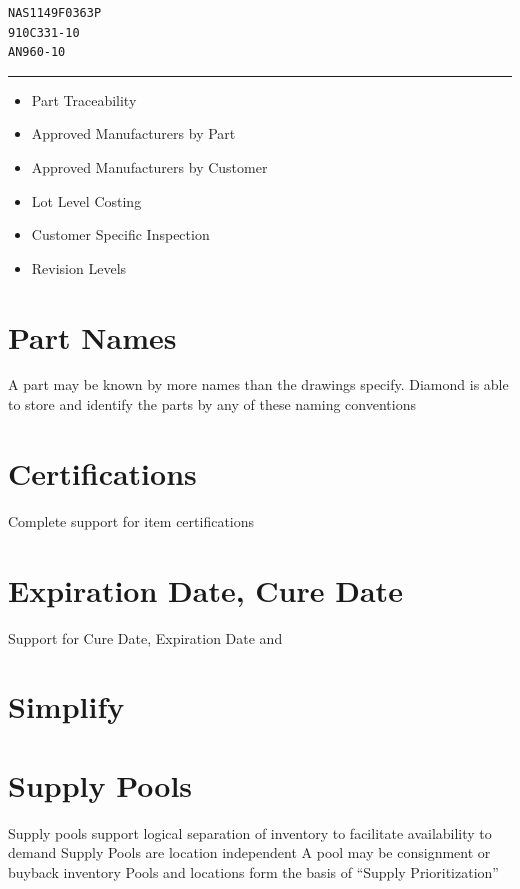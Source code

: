 \documentclass[letterpaper,10pt,english]{sphinxmanual}
\begin{document}
\begin{Verbatim}[commandchars=\\\{\}]
NAS1149F0363P
910C331-10
AN960-10
\end{Verbatim}


\bigskip\hrule{}\bigskip

\begin{itemize}
\item {} 
Part Traceability

\item {} 
Approved Manufacturers by Part

\item {} 
Approved Manufacturers by Customer

\item {} 
Lot Level Costing

\item {} 
Customer Specific Inspection

\item {} 
Revision Levels

\end{itemize}


\section{Part Names}
\label{APS/ApsFeatures:id1}
A part may be known by more names than the drawings specify. Diamond is
able to store and identify the parts by any of these naming conventions


\section{Certifications}
\label{APS/ApsFeatures:certifications}
Complete support for item certifications


\section{Expiration Date, Cure Date}
\label{APS/ApsFeatures:expiration-date-cure-date}
Support for Cure Date, Expiration Date and


\section{Simplify}
\label{APS/ApsFeatures:simplify}

\section{Supply Pools}
\label{APS/ApsFeatures:supply-pools}
Supply pools support logical separation of inventory to facilitate
availability to demand Supply Pools are location independent A pool may
be consignment or buyback inventory Pools and locations form the basis
of “Supply Prioritization”
\end{document}
